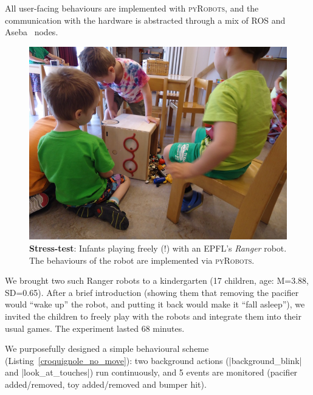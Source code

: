 \documentclass[letterpaper, 10pt, conference]{ieeeconf}      %
\newcommand{\pyRobots}{\textsc{pyRobots}}
\begin{document}
All user-facing behaviours are implemented with \pyRobots{},
and the communication with the hardware is abstracted through a mix of ROS
and Aseba~\cite{magnenat2011aseba} nodes.

\begin{figure}
        \centering
        \includegraphics[width=0.9\columnwidth]{ranger-side}
        \caption{\textbf{Stress-test}: Infants playing freely (!) with an EPFL's \emph{Ranger} robot.
        The behaviours of the robot are implemented via \pyRobots{}.}
        \label{expe-nursery}
\end{figure}

We brought two such Ranger robots to a kindergarten (17 children, age: M=3.88,
SD=0.65). After a brief introduction (showing them that removing the pacifier
would ``wake up'' the robot, and putting it back would make it ``fall asleep''),
we invited the children to freely play with the robots and integrate them into
their usual games. The experiment lasted 68 minutes.

We purposefully designed a simple behavioural scheme
(Listing~\ref{croquignole_no_move}): two background actions
(\python|background_blink| and \python|look_at_touches|) run continuously, and 5
events are monitored (pacifier added/removed, toy added/removed and bumper hit).
\end{document}

